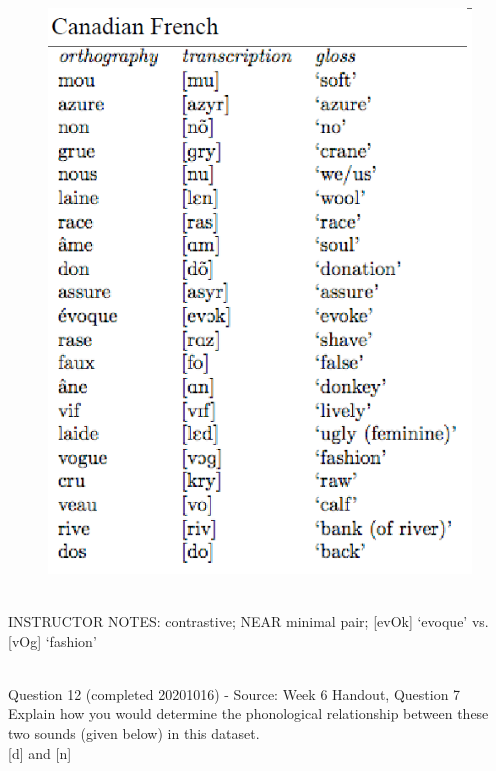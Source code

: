 \documentclass[12pt]{article}
\begin{document}
\begin{figure}[H]
\includegraphics{../images/canadianfrench.png}
\end{figure}

~\\
INSTRUCTOR NOTES: contrastive; NEAR minimal pair; [evOk] ‘evoque’ vs. [vOg] ‘fashion’


~\\

{\large Question 12} (completed 20201016) - Source: Week 6 Handout, Question 7\\

Explain how you would determine the phonological relationship between these two sounds (given below) in this dataset.\\

{[d]} and {[n]}
\end{document}
